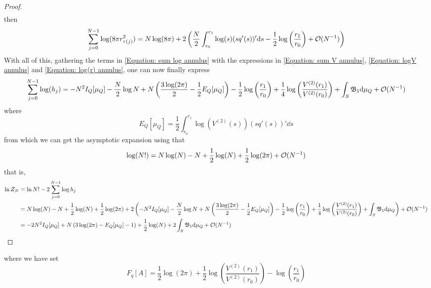 \begin{proof}
\begin{align}
\end{align}
then
\begin{equation}
	\sum_{j=0}^{N-1}  \log(8\pi r^2_{\tau(j)}) = N \log(8\pi) + 2 \left( \frac{N}{2} \int_{r_0}^{r_1} \log(s) (s q'(s))' \mathrm{d} s - \frac{1}{2} \log\left(\frac{r_1}{r_0}\right) + \mathcal{O}(N^{-1}) \right) 
	\label{Equation: log(r) annulus}
\end{equation}
With all of this, gathering the terms in \eqref{Equation: sum log annulus} with the expressions in \eqref{Equation: sum V annulus}, \eqref{Equation: logV annulus} and \eqref{Equation: log(r) annulus}, one can now finally express
\begin{equation}
	\sum_{j=0}^{N-1} \log(h_j) = - N^2 I_Q[\mu_Q] - \frac{N}{2} \log N + N \left(\frac{3\log(2\pi)}{2} - \frac{1}{2} E_Q[\mu_Q]\right) - \frac{1}{2} \log\left(\frac{r_1}{r_0} \right) + \frac{1}{4} \log\left(\frac{V^{(2)}(r_1)}{V^{(2)}(r_0)} \right) + \int_S \mathfrak{B}_1 \mathrm{d} \mu_Q + \mathcal{O}(N^{-1})
\end{equation}
where
\begin{equation}
	E_Q[\mu_Q] = \frac{1}{2} \int_{r_0}^{r_1} \log(V^{(2)}(s)) (sq'(s))' \dd s 
\end{equation}
from which we can get the asymptotic expansion using that
\begin{equation}
	\log(N!) = N\log(N) - N + \frac{1}{2} \log(N) + \frac{1}{2} \log(2 \pi) + \mathcal{O}(N^{-1})
\end{equation}
that is,
\begin{align}
	\ln Z_N & = \ln{N!} - 2 \sum_{j=0}^{N-1} \log{h_j} \\
	& = N\log(N) - N + \frac{1}{2} \log(N) + \frac{1}{2} \log(2 \pi) + 2 \left( - N^2 I_Q[\mu_Q] - \frac{N}{2} \log N + N \left(\frac{3\log(2\pi)}{2} - \frac{1}{2} E_Q[\mu_Q]\right) - \frac{1}{2} \log\left(\frac{r_1}{r_0} \right) + \frac{1}{4} \log\left(\frac{V^{(2)}(r_1)}{V^{(2)}(r_0)} \right) + \int_S \mathfrak{B}_1 \mathrm{d} \mu_Q \right) + \mathcal{O}(N^{-1}) \\
	& =  - 2 N^2 I_Q[\mu_Q] + N \left( 3\log(2\pi) - E_Q[\mu_Q] - 1\right) + \frac{1}{2} \log(N) + 2 \int_S \mathfrak{B}_1 \mathrm{d} \mu_Q + \mathcal{O}(N^{-1})
\end{align}

\end{proof}

where we have set
\begin{equation}
	F_q[A] = \frac{1}{2} \log(2 \pi) + \frac{1}{2} \log\left(\frac{V^{(2)}(r_1)}{V^{(2)}(r_0)} \right) - \log\left(\frac{r_1}{r_0} \right) 
\end{equation}